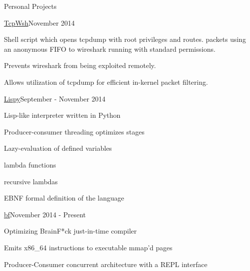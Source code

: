 \documentclass{resume} %
\begin{document}
\begin{rSection}{Personal Projects}

\begin{rSubsection}{\href{http://github.com/cptaffe/tcpwsh}{TcpWsh}}{November 2014}{}{}

	\item Shell script which opens tcpdump with root privileges and routes. packets using an anonymous FIFO to wireshark running with standard permissions.
	\item Prevents wireshark from being exploited remotely.
	\item Allows utilization of tcpdump for efficient in-kernel packet filtering.
\end{rSubsection}

\begin{rSubsection}{\href{http://github.com/cptaffe/lispy}{Lispy}}{September - November 2014}{}{}

	\item Lisp-like interpreter written in Python
	\item Producer-consumer threading optimizes stages
	\item Lazy-evaluation of defined variables
	\item lambda functions
	\item recursive lambdas
	\item EBNF formal definition of the language
\end{rSubsection}

\begin{rSubsection}{\href{http://github.com/cptaffe/bf}{bf}}{November 2014 - Present}{}{}

	\item Optimizing BrainF*ck just-in-time compiler
	\item Emits x86\_64 instructions to executable mmap'd pages
	\item Producer-Consumer concurrent architecture with a REPL interface
\end{rSubsection}

\end{rSection}

\end{document}
